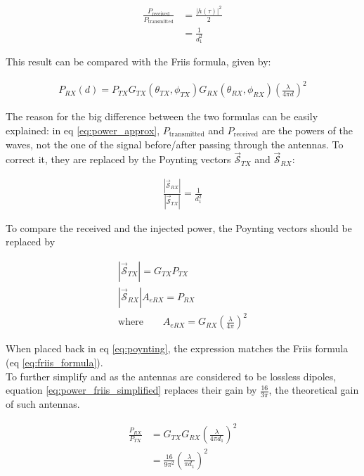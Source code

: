 \documentclass[10pt,a4paper]{ULBreport}
\begin{document}
\begin{align}
    \frac{P_{\text{received}}}{P_{\text{transmitted}}} &= \frac{\left| h(\tau) \right|^2}{2} \nonumber\\
    &= \frac{1}{d_1^2}
    \label{eq:power_approx}
\end{align}

This result can be compared with the Friis formula, given by:

\begin{align}
    P_{RX}(d) = P_{TX} G_{TX}(\theta_{TX}, \phi_{TX})G_{RX}(\theta_{RX}, \phi_{RX})\left(\frac{\lambda}{4\pi d}\right)^2
    \label{eq:friis_formula}
\end{align}

The reason for the big difference between the two formulas can be easily explained: in eq \ref{eq:power_approx}, $P_{\text{transmitted}}$ and $P_{\text{received}}$ are the powers of the waves, not the one of the signal before/after passing through the antennas. To correct it, they are replaced by the Poynting vectors $\bm{\vec{\mathscr{S}}}_{TX}$ and $\bm{\vec{\mathscr{S}}}_{RX}$:

\begin{align}
    \frac{\left|\bm{\vec{\mathscr{S}}}_{RX}\right|}{\left|\bm{\vec{\mathscr{S}}}_{TX}\right|} = \frac{1}{d_1^2}
    \label{eq:poynting}
\end{align}

To compare the received and the injected power, the Poynting vectors should be replaced by

\begin{align*}
    \left|\bm{\vec{\mathscr{S}}}_{TX}\right| = G_{TX} P_{TX}\\
    \left|\bm{\vec{\mathscr{S}}}_{RX}\right| A_{eRX} = P_{RX}\\
    \text{where} \quad \quad A_{eRX} = G_{RX}\left(\frac{\lambda}{4\pi}\right)^2
\end{align*}

When placed back in eq \ref{eq:poynting}, the expression matches the Friis formula (eq \ref{eq:friis_formula}). \\
To further simplify and as the antennas are considered to be lossless dipoles, equation \ref{eq:power_friis_simplified} replaces their gain by $\frac{16}{3\pi}$, the theoretical gain of such antennas.

\begin{align}
    \frac{P_{RX}}{P_{TX}} &= G_{TX} G_{RX} \left(\frac{\lambda}{4\pi d_1}\right)^2\\
    \label{eq:power_friis_simplified}
    &= \frac{16}{9\pi^2} \left(\frac{\lambda}{\pi d_1}\right)^2
\end{align}
\end{document}
